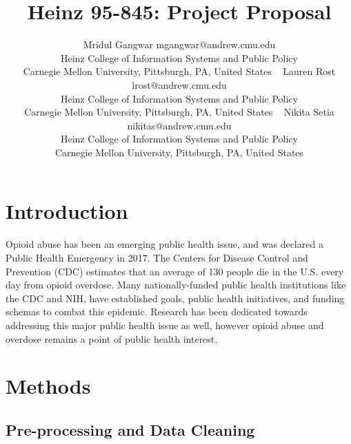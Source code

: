\documentclass[twoside,10.5pt]{article}
\let\footnote=\endnote
\begin{document}
\title{Heinz 95-845: Project Proposal}

\author{\name Mridul Gangwar \email mgangwar@andrew.cmu.edu \\
       \addr Heinz College of Information Systems and Public Policy\\
       Carnegie Mellon University, Pittsburgh, PA, United States \
       \AND
       \name Lauren Rost \email lrost@andrew.cmu.edu \\
       \addr Heinz College of Information Systems and Public Policy\\
       Carnegie Mellon University, Pittsburgh, PA, United States \
       \AND
       \name Nikita Setia \email nikitas@andrew.cmu.edu \\
       \addr Heinz College of Information Systems and Public Policy\\
       Carnegie Mellon University, Pittsburgh, PA, United States}
       
\maketitle
\vspace*{5px}
\section{Introduction}
Opioid abuse has been an emerging public health issue, and was declared a Public Health Emergency in 2017\footnote{\cite{HHS}}. The Centers for Disease Control and Prevention (CDC) estimates that an average of 130 people die in the U.S. every day from opioid overdose\footnote{\cite{Wonder}}. Many nationally-funded public health institutions like the CDC and NIH, have established goals, public health initiatives, and funding schemas to combat this epidemic\footnote{\cite{CADCA}}\footnote{\cite{CDC_OO}}\footnote{\cite{NationalInstitute}}. Research has been dedicated towards addressing this major public health issue as well, however opioid abuse and overdose remains a point of public health interest.   

\section{Methods}
\subsection{Pre-processing and Data Cleaning}
\end{document}

